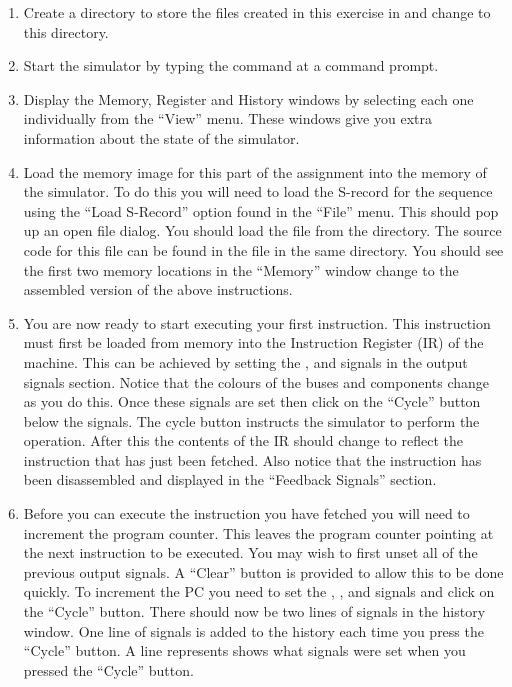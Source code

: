 \documentclass[a4paper,10pt]{article}
\begin{document}
\begin{enumerate}

\item Create a directory to store the files created in this exercise
in and change to this directory.

\item Start the simulator by typing the command  at
a command prompt.

\item Display the Memory, Register and History windows by selecting
each one individually from the ``View'' menu. These windows give you
extra information about the state of the simulator.

\item Load the memory image for this part of the assignment into the
memory of the simulator. To do this you will need to load the S-record
for the sequence using the ``Load S-Record'' option found in the
``File'' menu. This should pop up an open file dialog. You should load
the file  from the 
directory. The source code for this file can be found in the
 file in the same directory. You should see the first
two memory locations in the ``Memory'' window change to the assembled
version of the above instructions.

\item 
\label{ques:ifetch}
You are now ready to start executing your first instruction. This
instruction must first be loaded from memory into the Instruction
Register (IR) of the machine. This can be achieved by setting the
,  and  signals in
the output signals section. Notice that the colours of the buses and
components change as you do this. Once these signals are set then
click on the ``Cycle'' button below the signals. The cycle button
instructs the simulator to perform the operation. After this the
contents of the IR should change to reflect the instruction that has
just been fetched. Also notice that the instruction has been
disassembled and displayed in the ``Feedback Signals'' section.

\item Before you can execute the instruction you have fetched you will
need to increment the program counter. This leaves the program counter
pointing at the next instruction to be executed. You may wish to first
unset all of the previous output signals. A ``Clear'' button is
provided to allow this to be done quickly. To increment the PC you
need to set the , ,
 and  signals and click on the
``Cycle'' button. There should now be two lines of signals in the
history window. One line of signals is added to the history each time
you press the ``Cycle'' button. A line represents shows what signals
were set when you pressed the ``Cycle'' button.


\end{enumerate}
\end{document}
